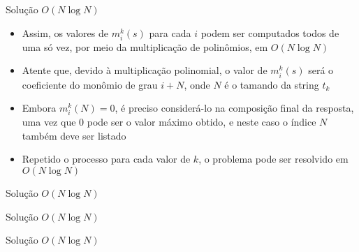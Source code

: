 \begin{frame}[fragile]{Solução $O(N\log N)$}

    \begin{itemize}
        \item Assim, os valores de $m^k_i(s)$ para cada $i$ podem ser computados todos de uma
            só vez, por meio da multiplicação de polinômios, em $O(N\log N)$

        \item Atente que, devido à multiplicação polinomial, o valor de $m^k_i(s)$ será o 
            coeficiente do monômio de grau $i + N$, onde $N$ é o tamando da string $t_k$

        \item Embora $m^k_i(N) = 0$, é preciso considerá-lo na composição final da resposta,
            uma vez que $0$ pode ser o valor máximo obtido, e neste caso o índice $N$ também
            deve ser listado

        \item Repetido o processo para cada valor de $k$, o problema pode ser resolvido em
            $O(N\log N)$
    \end{itemize}

\end{frame}

\begin{frame}[fragile]{Solução $O(N\log N)$}
\end{frame}

\begin{frame}[fragile]{Solução $O(N\log N)$}
\end{frame}

\begin{frame}[fragile]{Solução $O(N\log N)$}
\end{frame}
